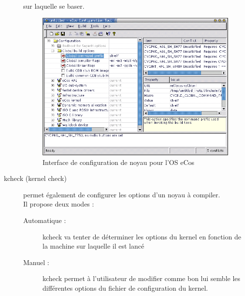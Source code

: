 \documentclass[16pts]{report}
\begin{document}
\begin{description}
        sur laquelle se baser. \\
        \begin{figure}[H]
            \includegraphics[scale=1.2]{illustrations/eCos_config.png}
            \centering
            \caption{Interface de configuration de noyau pour l'OS eCos}
            \label{fig:InterfaceEcos}
        \end{figure}
        \pagebreak
    \item[kcheck (kernel check)] permet également de configurer les options
        d’un noyau à compiler. \\
        Il propose deux modes : \\
    \begin{description}
        \item[Automatique :] kcheck va tenter de déterminer les options du kernel
            en fonction de la machine sur laquelle il est lancé
        \item[Manuel :] kcheck permet à l’utilisateur de modifier comme bon lui
            semble les différentes options du fichier de configuration du kernel.
    \end{description}
        \begin{figure}[H]

\end{figure}
\end{description}
\end{document}
